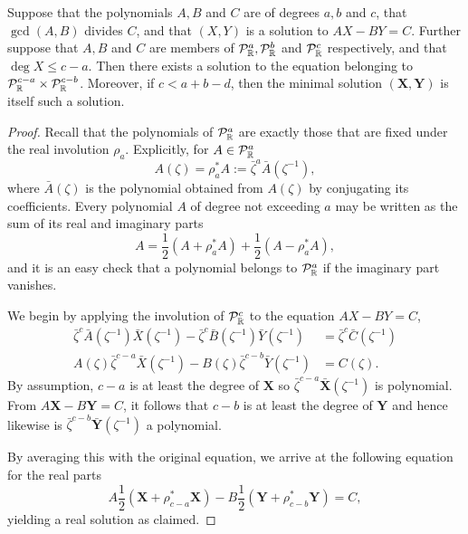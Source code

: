 \documentclass{article}
\begin{document}
\begin{lem}
Suppose that the polynomials $A,B$ and $C$ are of degrees $a,b$ and $c$, that $\gcd(A,B)$ divides $C$, and that $(X,Y)$ is a solution to $AX-BY=C$.
Further suppose that $A,B$ and $C$ are members of $\mathcal{P}^a_{\mathbb{R}},\mathcal{P}^b_{\mathbb{R}}$ and $\mathcal{P}^c_{\mathbb{R}}$ respectively, and that $\deg X \leq c-a$.
Then there exists a solution to the equation belonging to $\mathcal{P}^{c-a}_{\mathbb{R}} \times \mathcal{P}^{c-b}_{\mathbb{R}}$.
Moreover, if $c < a+b-d$, then the minimal solution $(\mathbf{X},\mathbf{Y})$ is itself such a solution.

\begin{proof}
Recall that the polynomials of $\mathcal{P}^a_{\mathbb{R}}$ are exactly those that are fixed under the real involution $\rho_a$. Explicitly, for $A \in \mathcal{P}_{\mathbb{R}}^a$
\[
A(\zeta) = \rho_a^* A := \bar{\zeta}^a \bar{A}\left(\zeta^{-1}\right),
\]
where $\bar{A}(\zeta)$ is the polynomial obtained from $A(\zeta)$ by conjugating its coefficients. Every polynomial $A$ of degree not exceeding $a$ may be written as the sum of its real and imaginary parts
\[
A = \frac{1}{2}\left( A + \rho_a^* A \right) + \frac{1}{2}\left( A - \rho_a^* A \right),
\]
and it is an easy check that a polynomial belongs to $\mathcal{P}_{\mathbb{R}}^a$ if the imaginary part vanishes.

We begin by applying the involution of $\mathcal{P}_{\mathbb{R}}^c$ to the equation $AX-BY=C$,
\begin{align*}
\bar{\zeta}^c\bar{A}(\zeta^{-1})\bar{X}(\zeta^{-1})
-\bar{\zeta}^c\bar{B}(\zeta^{-1})\bar{Y}(\zeta^{-1})
&= \bar{\zeta}^c\bar{C}(\zeta^{-1}) \\
A(\zeta)\bar{\zeta}^{c-a}\bar{X}(\zeta^{-1})
-B(\zeta)\bar{\zeta}^{c-b}\bar{Y}(\zeta^{-1})
&= C(\zeta).
\end{align*}
By assumption, $c-a$ is at least the degree of $\mathbf{X}$ so $\bar{\zeta}^{c-a}\bar{\mathbf{X}}(\zeta^{-1})$ is polynomial. From $A\mathbf{X} - B\mathbf{Y} = C$, it follows that $c-b$ is at least the degree of $\mathbf{Y}$ and hence likewise is $\bar{\zeta}^{c-b}\bar{\mathbf{Y}}(\zeta^{-1})$ a polynomial.

By averaging this with the original equation, we arrive at the following equation for the real parts
\[
A\frac{1}{2}\left(\mathbf{X} + \rho_{c-a}^*\mathbf{X} \right)
-B\frac{1}{2}\left(\mathbf{Y} + \rho_{c-b}^*\mathbf{Y} \right)
= C,
\]
yielding a real solution as claimed.


\end{proof}
\end{lem}
\end{document}
